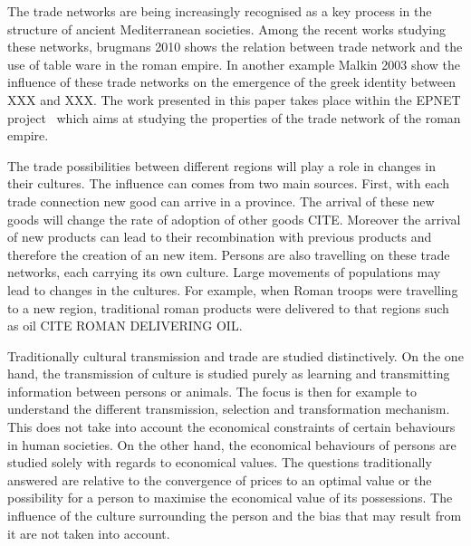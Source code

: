 \documentclass{wscpaperproc}
\begin{document}
The trade networks are being increasingly recognised as a key process in the structure of ancient Mediterranean societies. Among the recent works studying these networks, brugmans 2010 shows the relation between trade network and the use of table ware in the roman empire. In another example Malkin 2003 show the influence of these trade networks on the emergence of the greek identity between XXX and XXX. 
The work presented in this paper takes place within the EPNET project~\cite{remesal_epnet_2014} which aims at studying the properties of the trade network of the roman empire.


The trade possibilities between different regions will play a role in changes in their cultures. The influence can comes from two main sources. First, with each trade connection new good can arrive in a province. The arrival of these new goods will change the rate of adoption of other goods CITE. Moreover the arrival of new products can lead to their recombination with previous products and therefore the creation of an new item. Persons are also travelling on these trade networks, each carrying its own culture. Large movements of populations may lead to changes in the cultures. For example, when Roman troops were travelling to a new region, traditional roman products were delivered to that regions such as oil CITE ROMAN DELIVERING OIL.


Traditionally cultural transmission and trade are studied distinctively.  On the one hand, the transmission of culture is studied purely as learning and transmitting information between persons or animals. The focus is then for example to understand the different transmission, selection and transformation mechanism. This does not take into account the economical constraints of certain behaviours in human societies. On the other hand, the economical behaviours of persons are studied solely with regards to economical values. The questions traditionally answered are relative to the convergence of prices to an optimal value or the possibility for a person to maximise the economical value of its possessions. The influence of the culture surrounding the person and the bias that may result from it are not taken into account.
\end{document}
